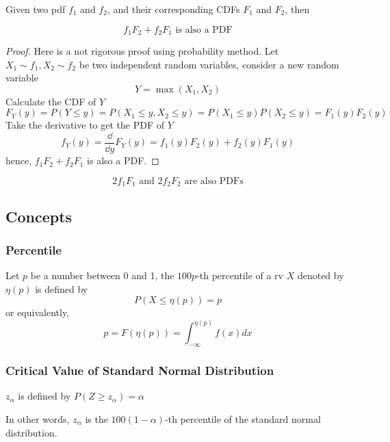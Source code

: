 \documentclass{template}
\begin{document}
Given two pdf \( f_1 \) and \( f_2 \), and their corresponding CDFs \( F_1 \) and \( F_2 \), then
\begin{theorem}
	\[
		f_1F_2 + f_2F_1 \text{ is also a PDF}
	\] 
	\begin{proof}
		Here is a not rigorous proof using probability method.
		Let  $X_1 \sim f_1, X_2 \sim f_2$ be two independent random variables, consider a new random variable
		\[
		Y = \max(X_1, X_2)
		\] 
		Calculate the CDF of $Y$
		\[
		F_Y(y) = P(Y \leq y) = P(X_1 \leq y, X_2 \leq y) = P(X_1 \leq y)P(X_2 \leq y) = F_1(y)F_2(y)
		\] 
		Take the derivative to get the PDF of $Y$
		\[
		f_Y(y) = \frac{\dd}{\dd y} F_Y(y) = f_1(y)F_2(y) + f_2(y)F_1(y)
		\]
		hence, $f_1F_2 + f_2F_1$ is also a PDF.
	\end{proof}
\end{theorem}
\begin{theorem}
	\[
		2f_1F_1 \text{ and } 2f_2F_2 \text{ are also PDFs}
	\] 
	
\end{theorem}


\subsection{Concepts}

\subsubsection{Percentile}
Let $p$ be a number between 0 and 1, the $100p$-th percentile of a rv $X$
denoted by $\eta(p)$ is defined by
\[
	P(X \leq \eta(p)) = p
\] 
or equivalently,
\[
	p = F(\eta(p)) = \int_{-\infty}^{\eta(p)} f(x) dx
\] 
\subsubsection{Critical Value of Standard Normal Distribution}
$z_\alpha$ is defined by $P(Z \geq z_\alpha) = \alpha$

In other words, $z_\alpha$ is the $100(1-\alpha)$-th percentile of the standard normal distribution.

\begin{center}
\end{center}
\end{document}
